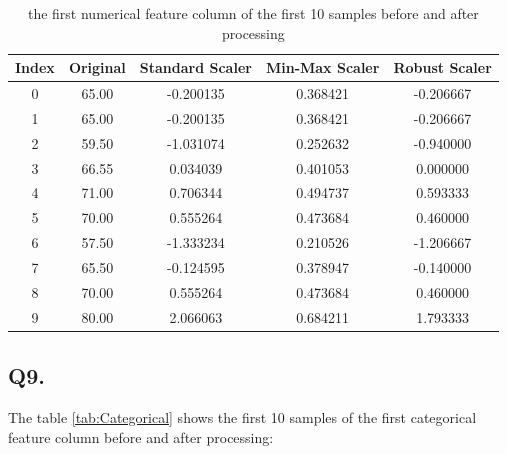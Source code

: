 \documentclass{article}
\begin{document}
\begin{table}[h!]
    \centering
    \small
    \begin{tabular}{|c|c|c|c|c|}
        \hline
        Index & Original & Standard Scaler & Min-Max Scaler & Robust Scaler \\
        \hline
        0  & 65.00 & -0.200135 & 0.368421 & -0.206667 \\
        1  & 65.00 & -0.200135 & 0.368421 & -0.206667 \\
        2  & 59.50 & -1.031074 & 0.252632 & -0.940000 \\
        3  & 66.55 &  0.034039 & 0.401053 & 0.000000 \\
        4  & 71.00 &  0.706344 & 0.494737 & 0.593333 \\
        5  & 70.00 &  0.555264 & 0.473684 & 0.460000 \\
        6  & 57.50 & -1.333234 & 0.210526 & -1.206667 \\
        7  & 65.50 & -0.124595 & 0.378947 & -0.140000 \\
        8  & 70.00 &  0.555264 & 0.473684 & 0.460000 \\
        9  & 80.00 &  2.066063 & 0.684211 & 1.793333 \\
        \hline
    \end{tabular}
    \caption{ the first numerical feature column of the first 10 samples before and after processing}
    \label{tab:Standardize}
\end{table}


\subsection*{Q9.}

The table \ref{tab:Categorical} shows the first 10 samples of the first categorical feature column before and after processing:
\end{document}
